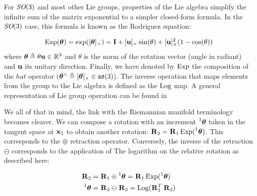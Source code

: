 For $\textit{SO}(3)$ and most other Lie groups, properties of the Lie algebra simplify the infinite sum of the matrix exponential to a simpler closed-form formula. 
In the $\textit{SO}(3)$ case, this formula is known as the Rodriguez equation:

\begin{equation}
    \operatorname*{Exp}({\bm \theta}) = \exp([{\bm \theta}]_{\times}) = {\bf I} + [{\bf u}]_{\times}\sin(\theta) + [{\bf u}]_{\times}^2(1 - \cos(\theta))
\end{equation}
%
where ${\bm \theta} \triangleq \theta {\bf u} \in \mathbb{R}^3$ and $\theta$ is the norm of the rotation vector (angle in radiant) and ${\bf u}$ its unitary direction.
Finally, we have denoted by $\operatorname*{Exp}$ the composition of the $hat$ operator (${\bm \theta}^\wedge \triangleq [{\bm \theta}]_{\times} \in {\mathfrak {so}}(3)$). 
The inverse operation that maps elements from the group to the Lie algebra is defined as the $\operatorname*{Log}$ map. A general representation of
Lie group operation can be found in 

We all of that in mind, the link with the Riemannian manifold terminology becomes clearer. We can compose a rotation with
an increment $\prescript{1}{}{{\bm \theta}}$ taken in the tangent space at ${\bf x}_1$ to obtain another rotation: $\prescript{}{}{{\bf R}}_{2} = \prescript{}{}{{\bf R}}_{1}\operatorname*{Exp}(\prescript{1}{}{{\bm \theta}})$.
This corresponds to the $\oplus$ retraction operator. Conversely, the inverse of the retraction $\ominus$ corresponds to the application of The
logarithm on the relative rotation as described here:

\begin{align}
    \Rot{}{2} &= \Rot{}{1}\oplus \prescript{1}{}{\bftheta} = \Rot{}{1} \Exp(\prescript{1}{}{\bftheta})  \\ 
    \prescript{1}{}{\bftheta} &= \Rot{}{2}\ominus \Rot{}{2} = \Log(\Rot{}{1}^T\Rot{}{2}) 
\end{align}

